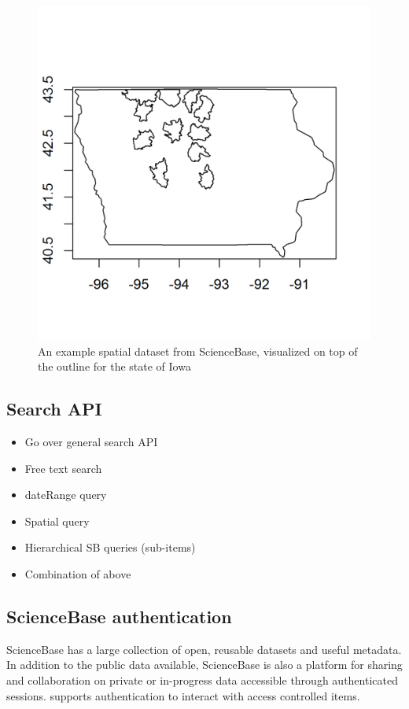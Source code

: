  \begin{figure}[htbp]
   \centering
   \includegraphics{mapfig}
   \caption{An example spatial dataset from ScienceBase, 
   visualized on top of the outline for the state of Iowa}
   \label{figure:iowafig}
 \end{figure}


\subsection{Search API}
\begin{itemize}
	\item{Go over general search API}
	\item{Free text search}
	\item{dateRange query}
	\item{Spatial query}
	\item{Hierarchical SB queries (sub-items)}
	\item{Combination of above}
\end{itemize}

\subsection{ScienceBase authentication}
ScienceBase has a large collection of open, reusable datasets and 
useful metadata. In addition to the public data available, ScienceBase
is also a platform for sharing and collaboration on private or in-progress 
data accessible through authenticated sessions.  supports 
authentication to interact with access controlled items.

